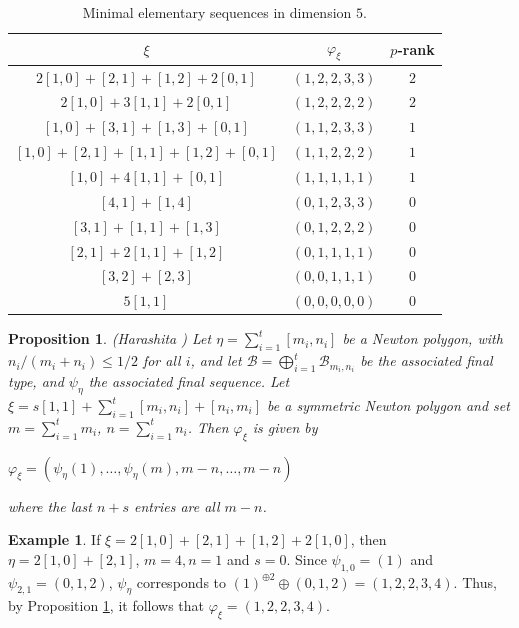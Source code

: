 \documentclass[11pt,table]{amsart}
\numberwithin{equation}{section}
\newtheorem{prop}[thm]{Proposition}
\theoremstyle{definition}
\newtheorem{eg}[thm]{Example}
\theoremstyle{remark}
\theoremstyle{remark}
\begin{document}
\begin{table}[ht]
    \centering
    \begin{tabular}{|c|c|c|}
    \hline
    $\xi$ &  $\varphi_{\xi}$ & $p$-rank  \\
    \hline 
$2[1,0] + [2,1] + [1,2]  +2[0,1]$ & $(1,2,2,3,3) $ & $2$\\
$ 2[1,0] + 3[1,1] + 2[0,1]$ & $(1,2,2,2,2) $ & $2$ \\
$ [1,0] + [3,1] + [1,3] + [0,1]$ & $(1,1,2,3,3)$ & $1$ \\
$[1,0] + [2,1] + [1,1] + [1,2] + [0,1]$ & $(1,1,2,2,2) $ & $1$ \\
$[1,0] + 4[1,1] + [0,1] $ & $(1,1,1,1,1) $ & $1$ \\
   $[4,1] + [1,4]$ & $(0,1,2,3,3)$ & $0$ \\
   $[3,1] + [1,1] + [1,3]$ & $(0,1,2,2,2)$ & $0$ \\
   $[2,1] + 2[1,1] + [1,2]$ & $(0,1,1,1,1)$ & $0 $ \\
   $[3,2] + [2,3] $ & $(0,0,1,1,1)$ & $0$ \\
    $5[1,1] $ & $ (0,0,0,0,0)$ & $0$\\
  \hline 
   \end{tabular}
      \caption{Minimal elementary sequences in dimension $5$.}
    \label{minimaleltseq}
    \end{table}


    
\begin{prop}{({\rm Harashita} \cite[Corollary 4.22]{harashita2009configuration})} \label{finalseqcoms} Let $\eta = \sum_{i=1}^{t}[m_i, n_i]$ be a Newton polygon, with $n_i/(m_i + n_i) \le 1/2$ for all $i$, and let $\mathcal{B} = \bigoplus_{i=1}^{t} \mathcal{B}_{m_i, n_i}$ be the associated final type, and $\psi_{\eta}$ the associated final sequence.  Let $\xi = s[1,1] + \sum_{i=1}^{t} [m_i, n_i] + [n_i, m_i]$ be a symmetric Newton polygon and set $m = \sum_{i=1}^t m_i$, $n = \sum_{i=1}^t n_i$. Then $\varphi_{\xi}$ is given by 
\begin{center}
    $\varphi_{\xi} = (\psi_{\eta}(1), \ldots, \psi_{\eta}(m), m-n, \ldots, m-n)$
\end{center}
where the last $n+s$ entries are all $m-n$.
\end{prop}

\begin{eg}
 If $\xi = 2[1,0] + [2,1] + [1,2] + 2[1,0]$, then $\eta = 2[1,0] + [2,1]$, $m=4, n=1$ and $s=0$. Since $ \psi_{1,0} = (1)$ and $ \psi_{2,1} = (0,1,2)$, $\psi_{\eta}$  corresponds to $(1)^{\oplus 2} \oplus (0,1,2) = (1,2,2,3,4)$. Thus, by Proposition \ref{finalseqcoms}, it follows that $\varphi_{\xi} = (1,2,2,3,4)$.
 \end{eg}
\end{document}
